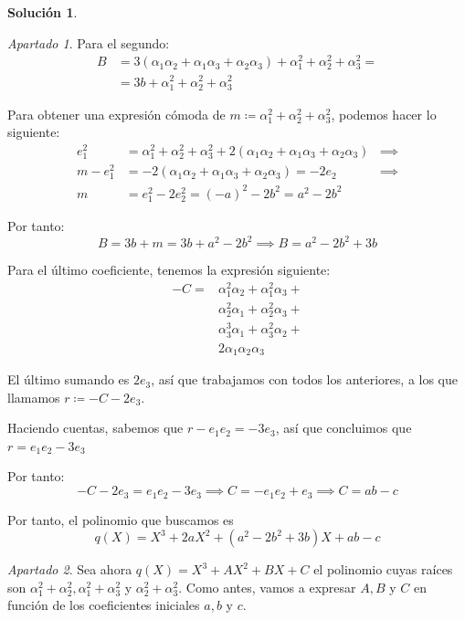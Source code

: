 \documentclass[a4paper, 11pt]{article}
\theoremstyle{definition}
\newtheorem*{solucion}{Solución}
\theoremstyle{remark}
\newtheorem{apartado}{Apartado}[ejercicio]
\begin{document}
\begin{solucion}
\begin{apartado}
          Para el segundo:
          \begin{align*}
              B &= 3(\alpha_1\alpha_2 + \alpha_1\alpha_3 + \alpha_2\alpha_3) + \alpha_1^2 + \alpha_2^2 + \alpha_3^2 = \\
                &= 3b + \alpha_1^2 + \alpha_2^2 + \alpha_3^2
          \end{align*}

          Para obtener una expresión cómoda de $m \coloneqq \alpha_1^2 + \alpha_2^2 + \alpha_3^2$, podemos hacer lo siguiente:
          \begin{align*}
          e_1^2 &= \alpha_1^2 + \alpha_2^2 + \alpha_3^2 + 2(\alpha_1\alpha_2+\alpha_1\alpha_3+\alpha_2\alpha_3) &\implies \\
          m - e_1^2 &= -2(\alpha_1\alpha_2+\alpha_1\alpha_3+\alpha_2\alpha_3) = -2e_2 &\implies \\
          m &= e_1^2 - 2e_2^2 = (-a)^2 -2b^2 = a^2 -2b^2
          \end{align*}

          Por tanto:
          \[
              B = 3b + m = 3b +a^2  -2b^2 \implies \boxed{B = a^2 -2b^2 + 3b}
          \]

          Para el último coeficiente, tenemos la expresión siguiente:
          \begin{align*}
              -C =& \alpha_1^2\alpha_2 + \alpha_1^2\alpha_3 + \\
                  & \alpha_2^2\alpha_1 + \alpha_2^2\alpha_3 + \\
                  & \alpha_3^3\alpha_1 + \alpha_3^2\alpha_2 + \\
                  & 2\alpha_1\alpha_2\alpha_3
          \end{align*}

          El último sumando es $2e_3$, así que trabajamos con todos los anteriores, a los que llamamos $r \coloneqq -C - 2e_3$.

          Haciendo cuentas, sabemos que $r-e_1e_2 = -3e_3$, así que concluimos que $r=e_1e_2 - 3e_3$

          Por tanto:
          \[
              -C -2e_3 = e_1e_2 - 3e_3 \implies C = -e_1e_2 + e_3 \implies \boxed{C = ab - c}
          \]

          Por tanto, el polinomio que buscamos es
          \[
          \boxed{q(X) = X^3 + 2aX^2 + (a^2 -2b^2 + 3b)X + ab -c}
          \]
      \end{apartado}

      \begin{apartado}
           Sea ahora $q(X) = X^3 + AX^2 + BX + C$ el polinomio cuyas raíces son $\alpha_1^2+\alpha_2^2, \alpha_1^2+\alpha_3^2$ y $\alpha_2^2+\alpha_3^2$. Como antes, vamos a expresar $A,B$ y $C$ en función de los coeficientes iniciales $a,b$ y $c$.


\end{apartado}
\end{solucion}
\end{document}
